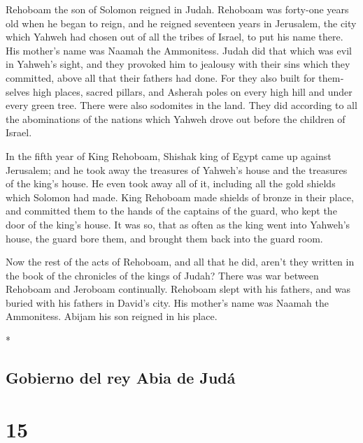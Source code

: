 \begin{paracol}{2}
\begin{otherlanguage}{english}
 Rehoboam the son of Solomon reigned in Judah. Rehoboam
was forty-one years old when he began to reign, and he reigned seventeen
years in Jerusalem, the city which Yahweh had chosen out of all the
tribes of Israel, to put his name there. His mother's name was Naamah
the Ammonitess.  Judah did that which was evil in
Yahweh's sight, and they provoked him to jealousy with their sins which
they committed, above all that their fathers had done. 
For they also built for themselves high places, sacred pillars, and
Asherah poles on every high hill and under every green tree.
 There were also sodomites in the land. They did
according to all the abominations of the nations which Yahweh drove out
before the children of Israel.

 In the fifth year of King Rehoboam, Shishak king of
Egypt came up against Jerusalem;  and he took away the
treasures of Yahweh's house and the treasures of the king's house. He
even took away all of it, including all the gold shields which Solomon
had made.  King Rehoboam made shields of bronze in their
place, and committed them to the hands of the captains of the guard, who
kept the door of the king's house.  It was so, that as
often as the king went into Yahweh's house, the guard bore them, and
brought them back into the guard room.

 Now the rest of the acts of Rehoboam, and all that he
did, aren't they written in the book of the chronicles of the kings of
Judah?  There was war between Rehoboam and Jeroboam
continually.  Rehoboam slept with his fathers, and was
buried with his fathers in David's city. His mother's name was Naamah
the Ammonitess. Abijam his son reigned in his place.

\end{otherlanguage}

\switchcolumn[0]*

\hypertarget{gobierno-del-rey-abia-de-juduxe1}{%
\subsection{Gobierno del rey Abia de
Judá}\label{gobierno-del-rey-abia-de-juduxe1}}

\hypertarget{section-28}{%
\section{15}\label{section-28}}


\end{paracol}
